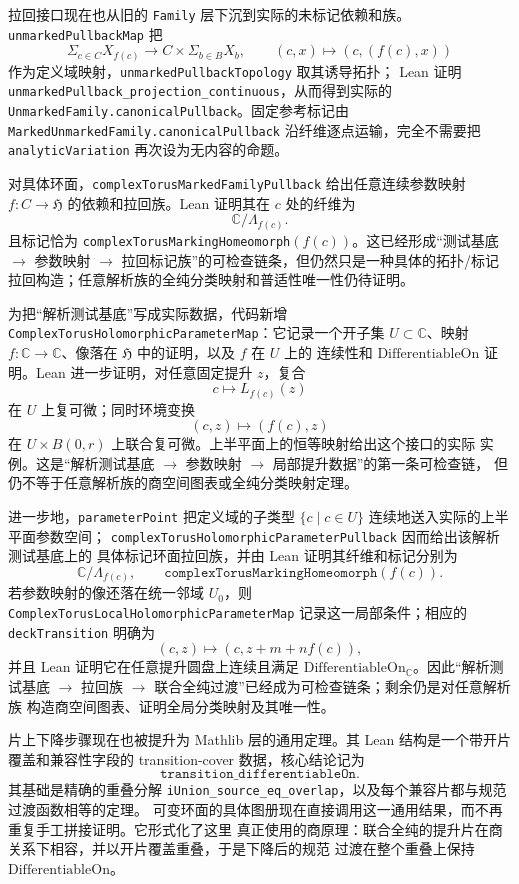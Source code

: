 \documentclass[UTF8,fontset=none,a4paper,11pt]{ctexart}
\begin{document}
拉回接口现在也从旧的 \texttt{Family} 层下沉到实际的未标记依赖和族。
\texttt{unmarkedPullbackMap} 把
\[
  \Sigma_{c\in C}X_{f(c)}
  \longrightarrow C\times\Sigma_{b\in B}X_b,
  \qquad
  (c,x)\longmapsto(c,(f(c),x))
\]
作为定义域映射，\texttt{unmarkedPullback\allowbreak Topology} 取其诱导拓扑；
Lean 证明
\texttt{unmarkedPullback\allowbreak\_projection\allowbreak\_continuous}，从而得到实际的
\texttt{UnmarkedFamily.\allowbreak canonicalPullback}。固定参考标记由
\texttt{MarkedUnmarkedFamily.\allowbreak canonicalPullback} 沿纤维逐点运输，完全不需要把
\texttt{analyticVariation} 再次设为无内容的命题。

对具体环面，\texttt{complexTorusMarkedFamily\allowbreak Pullback} 给出任意连续参数映射
\(f:C\to\mathfrak H\) 的依赖和拉回族。Lean 证明其在 \(c\) 处的纤维为
\[
  \mathbb C/\Lambda_{f(c)}.
\]
且标记恰为
\texttt{complexTorusMarking\allowbreak Homeomorph}\((f(c))\)。这已经形成“测试基底
\(\to\) 参数映射 \(\to\) 拉回标记族”的可检查链条，但仍然只是一种具体的拓扑/标记
拉回构造；任意解析族的全纯分类映射和普适性唯一性仍待证明。

为把“解析测试基底”写成实际数据，代码新增
\texttt{ComplexTorusHolomorphicParameterMap}：它记录一个开子集
\(U\subset\mathbb C\)、映射 \(f:\mathbb C\to\mathbb C\)、像落在
\(\mathfrak H\) 中的证明，以及 \(f\) 在 \(U\) 上的
连续性和 \(\mathrm{DifferentiableOn}\) 证明。Lean 进一步证明，对任意固定提升 \(z\)，复合
\[
  c\longmapsto L_{f(c)}(z)
\]
在 \(U\) 上复可微；同时环境变换
\[
  (c,z)\longmapsto(f(c),z)
\]
在 \(U\times B(0,r)\) 上联合复可微。上半平面上的恒等映射给出这个接口的实际
实例。这是“解析测试基底 \(\to\) 参数映射 \(\to\) 局部提升数据”的第一条可检查链，
但仍不等于任意解析族的商空间图表或全纯分类映射定理。

进一步地，\texttt{parameterPoint} 把定义域的子类型
\(\{c\mid c\in U\}\) 连续地送入实际的上半平面参数空间；
\texttt{complexTorusHolomorphicParameterPullback} 因而给出该解析测试基底上的
具体标记环面拉回族，并由 Lean 证明其纤维和标记分别为
\[
  \mathbb C/\Lambda_{f(c)},\qquad
  \texttt{complexTorusMarkingHomeomorph}(f(c)).
\]
若参数映射的像还落在统一邻域 \(U_0\)，则
\texttt{ComplexTorusLocalHolomorphicParameterMap} 记录这一局部条件；相应的
\texttt{deckTransition} 明确为
\[
  (c,z)\longmapsto(c,z+m+n f(c)),
\]
并且 Lean 证明它在任意提升圆盘上连续且满足
\(\mathrm{DifferentiableOn}_{\mathbb C}\)。因此“解析测试基底
\(\to\) 拉回族 \(\to\) 联合全纯过渡”已经成为可检查链条；剩余仍是对任意解析族
构造商空间图表、证明全局分类映射及其唯一性。

片上下降步骤现在也被提升为 Mathlib 层的通用定理。其 Lean 结构是一个带开片覆盖和兼容性字段的 transition-cover 数据，核心结论记为
\[
  \texttt{transition\_differentiableOn}.
\]
其基础是精确的重叠分解
\texttt{iUnion\_source\_eq\_overlap}，以及每个兼容片都与规范过渡函数相等的定理。
可变环面的具体图册现在直接调用这一通用结果，而不再重复手工拼接证明。它形式化了这里
真正使用的商原理：联合全纯的提升片在商关系下相容，并以开片覆盖重叠，于是下降后的规范
过渡在整个重叠上保持 \(\mathrm{DifferentiableOn}\)。
\end{document}
